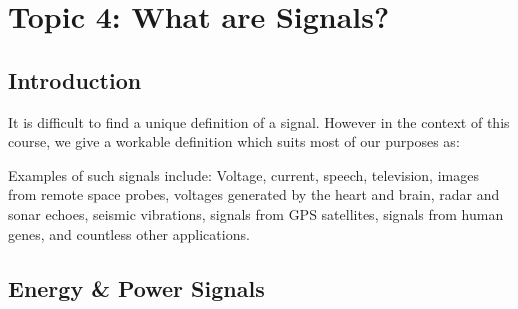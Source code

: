 \documentclass[../notes-main.tex]{subfiles}
\begin{document}
\section{Topic 4: What are Signals?}
\subsection{Introduction}
It is difficult to find a unique definition of a signal. However in the context of this course, we give a workable definition which suits most of our purposes as:

\begin{mdframed}
    \begin{center}
    \end{center}
\end{mdframed}\label{fig:signal-def-1}
\noindent Examples of such signals include: Voltage, current, speech, television, images from remote space probes, voltages generated by the heart and brain, radar and sonar echoes, seismic vibrations, signals from GPS satellites, signals from human genes, and countless other applications.
\subsection{Energy \& Power Signals}
\end{document}
